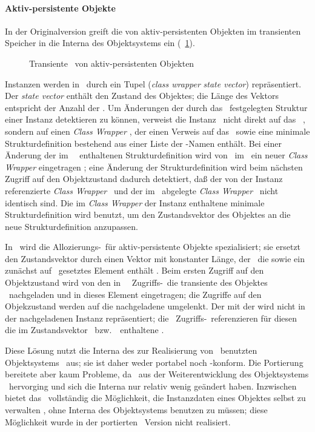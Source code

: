 \paragraph{Aktiv-persistente Objekte}%
\label{sec:sohaor}%
%
In der Originalversion greift die \representation{} von
ak\-tiv-per\-si\-sten\-ten Objekten im transienten Speicher in die
Interna des Objektsystems ein (\figurename~\ref{fig:clolout}). %
%
\ifbuch\else%
\begin{figure}[htbp]%
\centerline{}%
\caption{Transiente \protect\representation\ von aktiv-persistenten Objekten}%
\label{fig:clolout}%
\end{figure}%
\fi%
%
Instanzen werden in \clos\ durch ein Tupel ({\it\lt{}class
wrapper\gt\/} {\it\lt{}state vector\gt\/}) repr\"{a}sentiert. Der
{\it\lt{}state vector\gt\/} enth\"{a}lt den Zustand des Objektes; die
L\"{a}nge des Vektors entspricht der Anzahl der \Slt[s]. Um \"{A}nderungen
der durch das
\clsmo\ festgelegten Struktur einer Instanz detektieren zu k\"{o}nnen,
verweist die Instanz \oi\ nicht direkt auf das \clsmo\ \ovi,
sondern auf einen {\em Class Wrapper} \ov, der einen Verweis auf das
\clsmo\ sowie eine minimale Strukturdefinition bestehend aus einer
Liste der \Slt\/-Namen enth\"{a}lt. Bei einer \"{A}nderung der im
\clsmo\ \ovi\ enthaltenen Strukturdefinition wird von \clos\ im
\clsmo\ ein neuer {\em Class Wrapper\/} eingetragen \ovii; eine
\"{A}nderung der Strukturdefinition wird beim n\"{a}chsten Zugriff auf den
Objektzustand dadurch detektiert, da\ss{} der von der Instanz
referenzierte {\em Class Wrapper\/} \ov\ und der im \clsmo\ abgelegte
{\em Class Wrapper\/} \ovii\ nicht identisch sind. Die im {\em Class
Wrapper\/} der Instanz enthaltene minimale Strukturdefinition wird
benutzt, um den Zustandsvektor des Objektes an die neue
Strukturdefinition anzupassen.
%
\par{}In \soh\ wird die Allozierungs-\mtd\ f\"{u}r aktiv-persistente
Objekte spezialisiert; sie ersetzt den Zustandsvektor durch einen
Vektor mit konstanter L\"{a}nge, der \ua\ die \objid\/ sowie ein
zun\"{a}chst auf \lispnil\ gesetztes Element enth\"{a}lt \oii. Beim
ersten Zugriff auf den Objektzustand wird von den in
\soh\ \spc[n]\ Zugriffs-\mtd[n]\ die transiente \representation{} des
Objektes \oiv\ nachgeladen und in dieses Element
eingetragen; die Zugriffe auf den Objekzustand werden auf die
nachgeladene \representation{} \rglq{}umgelenkt\rgrq. Der \Slt\/ mit der
\objid\/ wird nicht in der nachgeladenen Instanz repr\"{a}sentiert;
die \spc[n]\ Zugriffs-\mtd[n]\ referenzieren f\"{u}r diesen
\Slt\/ die im Zustandsvektor \oii\ bzw.\ \oiii\ enthaltene \objid.
%
\par{}Diese L\"{o}sung nutzt die Interna des zur Realisierung von
\soh\ benutzten Objektsystems \pcl\ aus; sie ist daher weder portabel
noch \mop-konform. Die Portierung bereitete aber kaum Probleme, da
\clos\ aus der Weiterentwicklung des Objektsystems \pcl\ hervorging
und sich die Interna nur relativ wenig ge\"{a}ndert haben.
Inzwischen bietet das \mop\ vollst\"{a}ndig die M\"{o}glichkeit, die
Instanzdaten eines Objektes selbst zu verwalten , ohne
Interna des Objektsystems benutzen zu m\"{u}ssen; diese M\"{o}glichkeit
wurde in der portierten \soh\ Version nicht realisiert.
%

